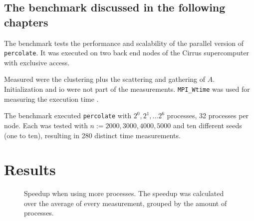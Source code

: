 \documentclass[twoside,11pt]{article}
\def\perc{\texttt{perco\-late}}
\begin{document}


\subsection{The benchmark discussed in the following
  chapters}
\label{subsec:bench}

The benchmark tests the performance and scalability of the
parallel version of \perc{}.
It was executed on two back end nodes of the Cirrus
supercomputer with exclusive access.

Measured were the clustering plus the scattering and
gathering of $A$.
Initialization and io were not part of the measurements.
\texttt{MPI\_Wtime} was used for measuring the execution
time \citep[see][Chapter 8]{mpi}.

The benchmark executed \perc{} with $2^0,2^1,\dots2^6$
processes, 32 processes per node.
Each was tested with $n := 2000, 3000, 4000, 5000$
and ten different seeds (one to ten), resulting in 280
distinct time measurements.



\section{Results} %


\begin{figure}
  \begin{center}
  \end{center}
  \caption{Speedup when using more processes. The speedup
    was calculated over the average of every measurement,
    grouped by the amount of processes.}
  \label{fig:speedup}
\end{figure}
\end{document}

